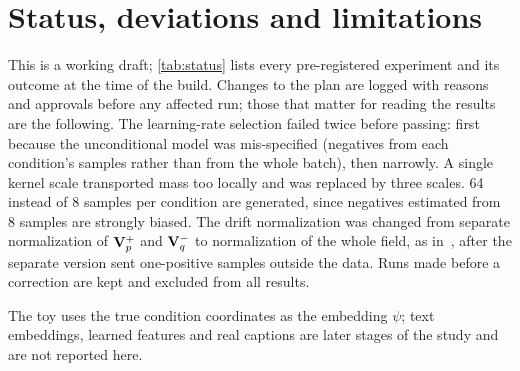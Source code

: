 \section{Status, deviations and limitations}
\label{sec:status}

This is a working draft; \cref{tab:status} lists every pre-registered experiment and its outcome at the time of the
build. Changes to the plan are logged with reasons and approvals before any affected run; those that matter for
reading the results are the following. The learning-rate selection failed twice before passing: first because the
unconditional model was mis-specified (negatives from each condition's samples rather than from the whole batch), then
narrowly. A single kernel scale transported mass too locally and was replaced by three scales. 64 instead of 8 samples
per condition are generated, since negatives estimated from 8 samples are strongly biased. The drift normalization was
changed from separate normalization of $\mathbf{V}^{+}_{p}$ and $\mathbf{V}^{-}_{q}$ to normalization of the whole field, as
in~\cite{deng2026drifting}, after the separate version sent one-positive samples outside the data. Runs made before a
correction are kept and excluded from all results.

The toy uses the true condition coordinates as the embedding $\psi$; text embeddings, learned features and real
captions are later stages of the study and are not reported here.

\begin{table}[h]
  \centering
  \small
  \resizebox{\linewidth}{!}{}
  \caption{Pre-registered experiments and their outcomes at build time.}
  \label{tab:status}
\end{table}
